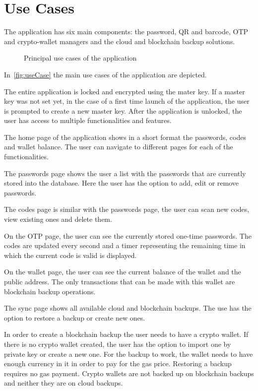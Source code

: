 \documentclass[a4paper,12pt]{report}
\begin{document}
\section{Use Cases}

The application has six main components: the password, QR and barcode, OTP and
crypto-wallet managers and the cloud and blockchain backup solutions.

\begin{figure}[H]
    \centering
    \scalebox{0.45}{\large}
    \caption{Principal use cases of the application}\label{fig:useCase}
\end{figure}

In~\autoref{fig:useCase} the main use cases of the application are depicted.

The entire application is locked and encrypted using the mater key. If a master
key was not set yet, in the case of a first time launch of the application, the
user is prompted to create a new master key. After the application is unlocked,
the user has access to multiple functionalities and features.

The home page of the application shows in a short format the passwords, codes
and wallet balance. The user can navigate to different pages for each of the
functionalities.

The passwords page shows the user a list with the passwords that are currently
stored into the database. Here the user has the option to add, edit or remove
passwords.

The codes page is similar with the passwords page, the user can scan new codes,
view existing ones and delete them.

On the OTP page, the user can see the currently stored one-time passwords. The
codes are updated every second and a timer representing the remaining time in
which the current code is valid is displayed.

On the wallet page, the user can see the current balance of the wallet and the
public address. The only transactions that can be made with this wallet are
blockchain backup operations.

The sync page shows all available cloud and blockchain backups. The use has the
option to restore a backup or create new ones.

In order to create a blockchain backup the user needs to have a crypto wallet.
If there is no crypto wallet created, the user has the option to import one by
private key or create a new one. For the backup to work, the wallet needs to
have enough currency in it in order to pay for the gas price. Restoring a
backup requires no gas payment. Crypto wallets are not backed up on blockchain
backups and neither they are on cloud backups.
\end{document}
